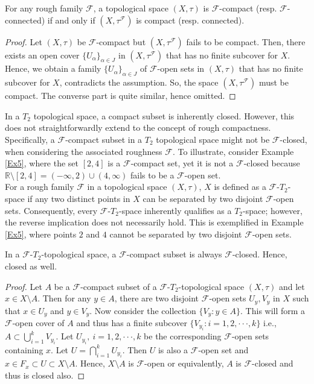 \documentclass[11pt]{amsart}
\begin{document}
\begin{theorem}\label{Thm6.2}
    For any rough family $\mathscr{F}$, a topological space $(X,\tau)$ is $\mathscr{F}$-compact (resp. $\mathscr{F}$-connected) if and only if $(X,\tau^\mathscr{F})$ is compact (resp. connected).
\end{theorem}

\begin{proof} Let $(X,\tau)$ be $\mathscr{F}$-compact but $(X,\tau^\mathscr{F})$ fails to be compact. Then, there exists an open cover $\{U_\alpha\}_{\alpha\in J}$ in $(X,\tau^\mathscr{F})$ that has no finite subcover for $X$. Hence, we obtain a family $\{U_\alpha\}_{\alpha\in J}$ of $\mathscr{F}$-open sets in $(X,\tau)$ that has no finite subcover for $X$, contradicts the assumption. So, the space $(X,\tau^\mathscr{F})$ must be compact. The converse part is quite similar, hence omitted.
\end{proof}

In a $T_2$ topological space, a compact subset is inherently closed. However, this does not straightforwardly extend to the concept of rough compactness. Specifically, a $\mathscr{F}$-compact subset in a $T_2$ topological space might not be $\mathscr{F}$-closed, when considering the associated roughness $\mathscr{F}$. To illustrate, consider Example \ref{Ex5}, where the set $[2,4]$ is a $\mathscr{F}$-compact set, yet it is not a $\mathscr{F}$-closed because $\mathbb{R}\setminus[2,4]=(-\infty, 2)\cup (4,\infty)$ fails to be a $\mathscr{F}$-open set.\\

For a rough family $\mathscr{F}$ in a topological space $(X,\tau)$, $X$ is defined as a $\mathscr{F}$-$T_{2}$-space if any two distinct points in $X$ can be separated by two disjoint $\mathscr{F}$-open sets. Consequently, every $\mathscr{F}$-$T_{2}$-space inherently qualifies as a $T_2$-space; however, the reverse implication does not necessarily hold. This is exemplified in Example \ref{Ex5}, where points $2$ and $4$ cannot be separated by two disjoint $\mathscr{F}$-open sets.

\begin{theorem}
 In a $\mathscr{F}$-$T_2$-topological space, a $\mathscr{F}$-compact subset is always $\mathscr{F}$-closed. Hence, closed as well.
\end{theorem}

\begin{proof}
Let $A$ be a $\mathscr{F}$-compact subset of a $\mathscr{F}$-$T_2$-topological space $(X,\tau)$ and let $x\in X\setminus A$. Then for any  $y\in A$, there are two disjoint $\mathscr{F}$-open sets $U_y, V_y$ in $X$ such that $x\in U_y$ and $y\in V_y$. Now consider the collection $\{V_y: y\in A\}$. This will form a $\mathscr{F}$-open cover of $A$ and thus has a finite subcover $\{V_{y_i}: i=1,2,\cdot\cdot\cdot, k\}$ i.e., $A\subset \bigcup^k_{i=1} V_{y_i}$. Let $U_{y_i},~ i=1,2,\cdot\cdot\cdot, k$ be the corresponding $\mathscr{F}$-open sets containing $x$. Let $U=\bigcap^k_{i=1} U_{y_i}$. Then $U$ is also a $\mathscr{F}$-open set and $x\in F_x\subset U\subset X\setminus A$. Hence, $X\setminus A$ is $\mathscr{F}$-open or equivalently, $A$ is $\mathscr{F}$-closed and thus is closed also.
\end{proof}
\end{document}

